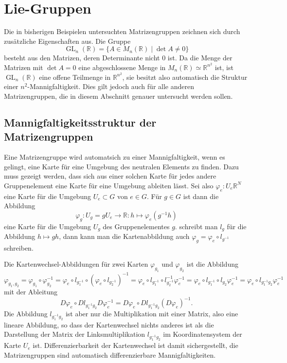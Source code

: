 %
%
%
\section{Lie-Gruppen
\label{buch:section:lie-gruppen}}
Die in bisherigen Beispielen untersuchten Matrizengruppen zeichnen sich
durch zusätzliche Eigenschaften aus.
Die Gruppe
\[
\operatorname{GL}_n(\mathbb{R}) 
=
\{ A \in M_n(\mathbb{R})\;|\; \det A \ne 0\}
\]
besteht aus den Matrizen, deren Determinante nicht $0$ ist.
Da die Menge der Matrizen mit $\det A=0$ eine abgeschlossene Menge
in $M_n(\mathbb{R}) \simeq \mathbb{R}^{n^2}$ ist, ist
$\operatorname{GL}_n(\mathbb{R})$ eine offene Teilmenge in $\mathbb{R}^{n^2}$,
sie besitzt also automatisch die Struktur einer $n^2$-Mannigfaltigkeit.
Dies gilt jedoch auch für alle anderen Matrizengruppen, die in diesem
Abschnitt genauer untersucht werden sollen.

\subsection{Mannigfaltigkeitsstruktur der Matrizengruppen
\label{buch:subsection:mannigfaltigkeitsstruktur-der-matrizengruppen}}
Eine Matrizengruppe wird automatsich zu einer Mannigfaltigkeit,
wenn es gelingt, eine Karte für eine Umgebung des neutralen Elements
zu finden.
Dazu muss gezeigt werden, dass sich aus einer solchen Karte für jedes
andere Gruppenelement eine Karte für eine Umgebung ableiten lässt.
Sei also $\varphi_e\colon U_e\mathbb{R}^N$ eine Karte für die Umgebung
$U_e\subset G$ von $e\in G$.
Für $g\in G$ ist dann die Abbildung
\[
\varphi_g
\colon
U_g
=
gU_e
\to
\mathbb{R}
:
h\mapsto \varphi_e(g^{-1}h)
\]
eine Karte für die Umgebung $U_g$ des Gruppenelementes $g$.
schreibt man $l_{g}$ für  die Abbildung $h\mapsto gh$, dann
kann man die Kartenabbildung auch $\varphi_g = \varphi_e\circ l_{g^{-1}}$
schreiben.

Die Kartenwechsel-Abbildungen für zwei Karten $\varphi_{g_1}$
und $\varphi_{g_2}$ ist die Abbildung
\[
\varphi_{g_1,g_2}
=
\varphi_{g_1}\circ \varphi_{g_2}^{-1}
=
\varphi_e\circ l_{g_1^{-1}} \circ (\varphi_e\circ l_{g_2^{-1}})^{-1}
=
\varphi_e\circ l_{g_1^{-1}} \circ l_{g_2^{-1}}^{-1} \varphi_e^{-1}
=
\varphi_e\circ l_{g_1^{-1}} \circ l_{g_2}\varphi_e^{-1}
=
\varphi_e\circ l_{g_1^{-1}g_2}\varphi_e^{-1}
\]
mit der Ableitung
\[
D\varphi_e\circ Dl_{g_1^{-1}g_2} D\varphi_e^{-1}
=
D\varphi_e\circ Dl_{g_1^{-1}g_2} (D\varphi_e)^{-1}.
\]
Die Abbildung $l_{g_1^{-1}g_2}$ ist aber nur die Multiplikation mit
einer Matrix, also eine lineare Abbildung, so dass der Kartenwechsel
nichts anderes ist als die Darstellung der Matrix der Linksmultiplikation
$l_{g_1^{-1}g_2}$ im Koordinatensystem der Karte $U_e$ ist.
Differenzierbarkeit der Kartenwechsel ist damit sichergestellt,
die Matrizengruppen sind automatisch differenzierbare Mannigfaltigkeiten.


